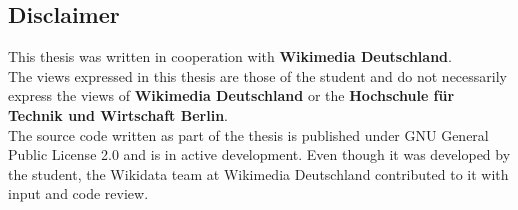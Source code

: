 \begin{centering}
\section*{Disclaimer}

This thesis was written in cooperation with \textbf{Wikimedia Deutschland}. \\
The views expressed in this thesis are those of the student and do not necessarily express the views of \textbf{Wikimedia Deutschland} or the \textbf{Hochschule für Technik und Wirtschaft Berlin}. \\
The source code written as part of the thesis is published under GNU General Public License 2.0 and is in active development. Even though it was developed by the student, the Wikidata team at Wikimedia Deutschland contributed to it with input and code review.

\end{centering}
